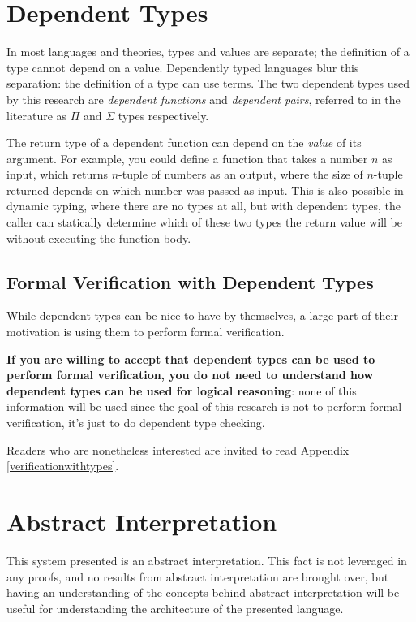 \documentclass[12pt,twoside]{report}
\begin{document}
\section{Dependent Types}
In most languages and theories, types and values are separate; the definition of a type cannot depend on a value. Dependently typed languages blur this separation: the definition of a type can use terms. The two dependent types used by this research are \textit{dependent functions} and \textit{dependent pairs}, referred to in the literature as $\Pi$ and $\Sigma$ types respectively.

The return type of a dependent function can depend on the \textit{value} of its argument. For example, you could define a function that takes a number $n$ as input, which returns $n$-tuple of numbers as an output, where the size of $n$-tuple returned depends on which number was passed as input. This is also possible in dynamic typing, where there are no types at all, but with dependent types, the caller can statically determine which of these two types the return value will be without executing the function body.

\subsection{Formal Verification with Dependent Types}
While dependent types can be nice to have by themselves, a large part of their motivation is using them to perform formal verification.

\textbf{If you are willing to accept that dependent types can be used to perform formal verification, you do not need to understand how dependent types can be used for logical reasoning}: none of this information will be used since the goal of this research is not to perform formal verification, it's just to do dependent type checking.

Readers who are nonetheless interested are invited to read Appendix \ref{verificationwithtypes}.

\section{Abstract Interpretation}
This system presented is an abstract interpretation. This fact is not leveraged in any proofs, and no results from abstract interpretation are brought over, but having an understanding of the concepts behind abstract interpretation will be useful for understanding the architecture of the presented language.
\end{document}
